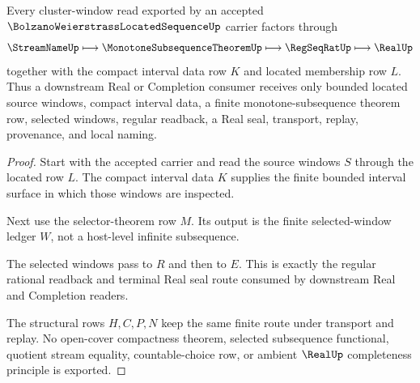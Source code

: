 \begin{theorem}
\label{thm:bolzano-weierstrass-located-sequence-subsequence-window}
Every cluster-window read exported by an accepted $\BolzanoWeierstrassLocatedSequenceUp$ carrier factors through
$$
\StreamNameUp
\longmapsto
\MonotoneSubsequenceTheoremUp
\longmapsto
\RegSeqRatUp
\longmapsto
\RealUp
$$
together with the compact interval data row $K$ and located membership row $L$. Thus a downstream Real or Completion consumer receives only bounded located source windows, compact interval data, a finite monotone-subsequence theorem row, selected windows, regular readback, a Real seal, transport, replay, provenance, and local naming.
\end{theorem}
\begin{proof}
Start with the accepted carrier and read the source windows $S$ through the located row $L$. The compact interval data $K$ supplies the finite bounded interval surface in which those windows are inspected.

Next use the selector-theorem row $M$. Its output is the finite selected-window ledger $W$, not a host-level infinite subsequence.

The selected windows pass to $R$ and then to $E$. This is exactly the regular rational readback and terminal Real seal route consumed by downstream Real and Completion readers.

The structural rows $H,C,P,N$ keep the same finite route under transport and replay. No open-cover compactness theorem, selected subsequence functional, quotient stream equality, countable-choice row, or ambient $\RealUp$ completeness principle is exported.
\end{proof}


